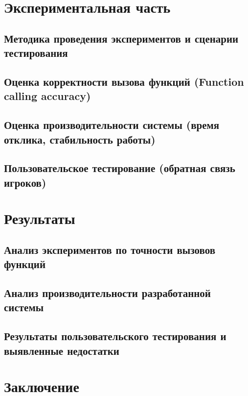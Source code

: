 \documentclass[14pt]{extarticle}
\begin{document}
\section{Экспериментальная часть}
\subsection{Методика проведения экспериментов и сценарии тестирования}
\subsection{Оценка корректности вызова функций (Function calling accuracy)}
\subsection{Оценка производительности системы (время отклика, стабильность работы)}
\subsection{Пользовательское тестирование (обратная связь игроков)}

\section{Результаты}
\subsection{Анализ экспериментов по точности вызовов функций}
\subsection{Анализ производительности разработанной системы}
\subsection{Результаты пользовательского тестирования и выявленные недостатки}

\section{Заключение}
\newpage
\newpage
{}

\end{document}
